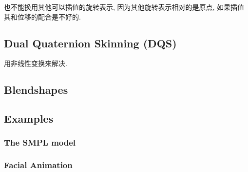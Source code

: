 也不能换用其他可以插值的旋转表示, 因为其他旋转表示相对的是原点, 如果插值其和位移的配合是不好的.


\subsection{Dual Quaternion Skinning (DQS)}
用非线性变换来解决. 


\subsection{Blendshapes}

\subsection{Examples}

\subsubsection{The SMPL model}

\subsubsection{Facial Animation}